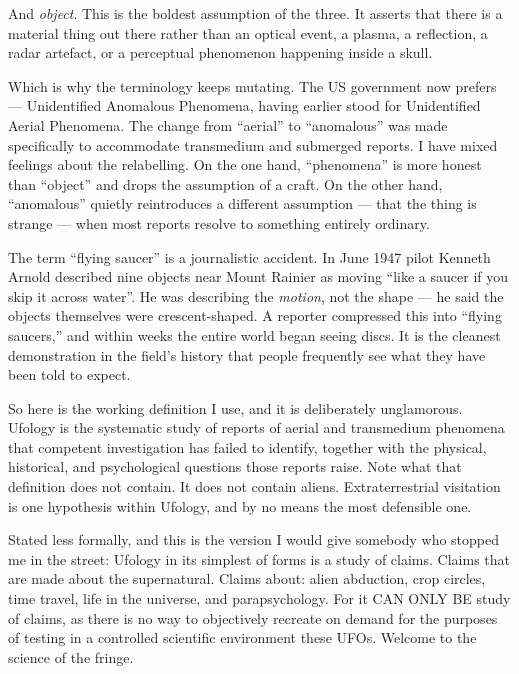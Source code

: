 And \emph{object}. This is the boldest assumption of the three. It asserts that there
is a material thing out there rather than an optical event, a plasma, a reflection, a
radar artefact, or a perceptual phenomenon happening inside a skull. 

Which is why the terminology keeps mutating. The US government now prefers
 --- Unidentified Anomalous Phenomena, having earlier stood for Unidentified
Aerial Phenomena. The change from ``aerial'' to ``anomalous'' was made specifically to
accommodate transmedium and submerged reports. I have mixed feelings about the
relabelling. On the one hand, ``phenomena'' is more honest than ``object'' and drops
the assumption of a craft. On the other hand, ``anomalous'' quietly reintroduces a
different assumption --- that the thing is strange --- when most reports resolve to
something entirely ordinary.

\begin{funfact}
The term ``flying saucer'' is a journalistic accident. In June 1947 pilot Kenneth
Arnold described nine objects near Mount Rainier as moving ``like a saucer if you skip
it across water''. He was describing the \emph{motion}, not the shape --- he said the
objects themselves were crescent-shaped. A reporter compressed this into ``flying
saucers,'' and within weeks the entire world began seeing discs. It is the cleanest
demonstration in the field's history that people frequently see what they have been
told to expect.
\end{funfact}

So here is the working definition I use, and it is deliberately unglamorous. Ufology is
the systematic study of reports of aerial and transmedium phenomena that competent
investigation has failed to identify, together with the physical, historical, and
psychological questions those reports raise. Note what that definition does not contain.
It does not contain aliens. Extraterrestrial visitation is one hypothesis within
Ufology, and by no means the most defensible one. 

Stated less formally, and this is the version I would give somebody who stopped me
in the street: Ufology in its simplest of forms is a study of claims. Claims that
are made about the supernatural. Claims about: alien abduction, crop circles, time
travel, life in the universe, and parapsychology. For it CAN ONLY BE study of
claims, as there is no way to objectively recreate on demand for the purposes of
testing in a controlled scientific environment these UFOs. Welcome to the science
of the fringe.

